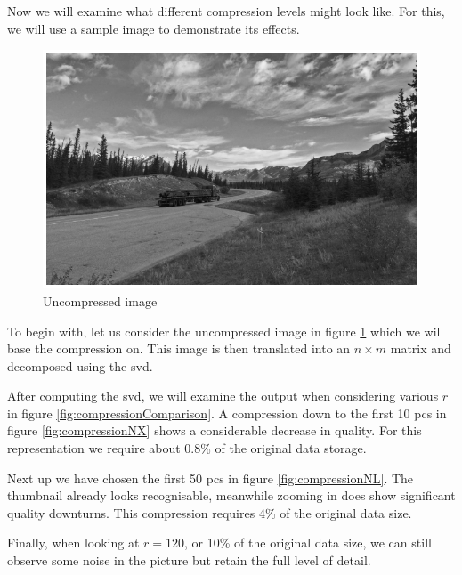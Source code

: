 Now we will examine what different compression levels might look like.
For this, we will use a sample image to demonstrate its effects.

\begin{figure}[ht]
    \centering
    \includegraphics[width=0.725\linewidth]{external_content/media/compression_example/uncompressed.png}
    \captionsetup{justification=centering}
    \caption{Uncompressed image}
    \label{fig:uncompressed}
\end{figure}
\vspace{-2mm}

To begin with, let us consider the uncompressed image in figure \ref{fig:uncompressed} which we will base the compression on.
This image is then translated into an $n \times m$ matrix and decomposed using the \gls{svd}.

After computing the \gls{svd}, we will examine the output when considering various $r$  in figure \ref{fig:compressionComparison}.
A compression down to the first 10 \glspl{pc} in figure \ref{fig:compressionNX} shows a considerable decrease in quality.
For this representation we require about 0.8\% of the original data storage.
\medskip

Next up we have chosen the first 50 \glspl{pc} in figure \ref{fig:compressionNL}.
The thumbnail already looks recognisable, meanwhile zooming in does show significant quality downturns.
This compression requires 4\% of the original data size.

Finally, when looking at $r=120$, or 10\% of the original data size, we can still observe some noise in the picture but retain the full level of detail.



